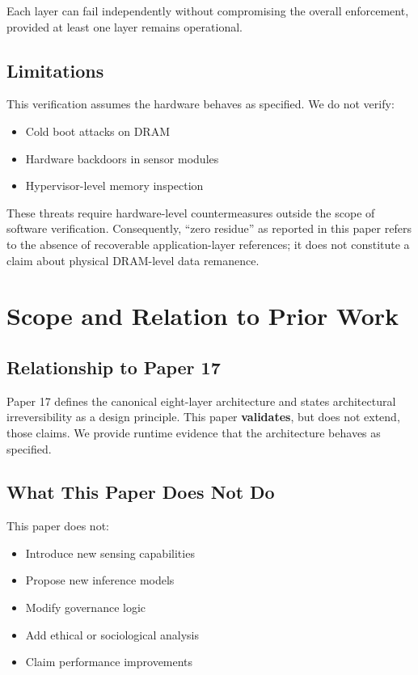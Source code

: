 \documentclass[conference]{IEEEtran}
\begin{document}
Each layer can fail independently without compromising the overall enforcement, provided at least one layer remains operational.

\subsection{Limitations}
This verification assumes the hardware behaves as specified. We do not verify:
\begin{itemize}
    \item Cold boot attacks on DRAM
    \item Hardware backdoors in sensor modules
    \item Hypervisor-level memory inspection
\end{itemize}

These threats require hardware-level countermeasures outside the scope of software verification. Consequently, ``zero residue'' as reported in this paper refers to the absence of recoverable application-layer references; it does not constitute a claim about physical DRAM-level data remanence.

\section{Scope and Relation to Prior Work}

\subsection{Relationship to Paper 17}
Paper 17 \cite{b17} defines the canonical eight-layer architecture and states architectural irreversibility as a design principle. This paper \textbf{validates}, but does not extend, those claims. We provide runtime evidence that the architecture behaves as specified.

\subsection{What This Paper Does Not Do}
This paper does not:
\begin{itemize}
    \item Introduce new sensing capabilities
    \item Propose new inference models
    \item Modify governance logic
    \item Add ethical or sociological analysis
    \item Claim performance improvements
\end{itemize}
\end{document}
